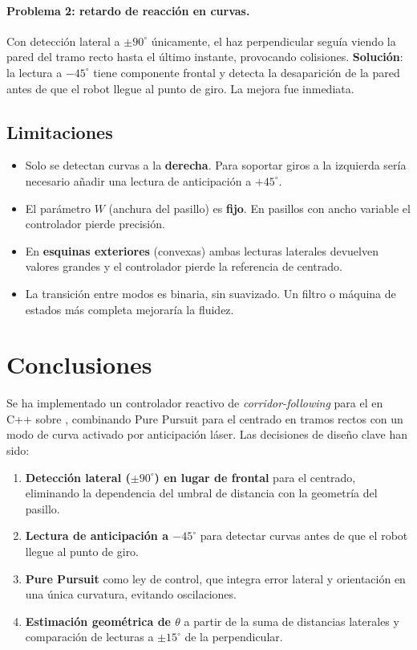 \documentclass[12pt]{article}
\begin{document}
\paragraph{Problema 2: retardo de reacci\'{o}n en curvas.}
Con detecci\'{o}n lateral a $\pm 90^\circ$ \'{u}nicamente, el haz perpendicular segu\'{i}a viendo la pared del tramo recto hasta el \'{u}ltimo instante, provocando colisiones. \textbf{Soluci\'{o}n}: la lectura a $-45^\circ$ tiene componente frontal y detecta la desaparici\'{o}n de la pared antes de que el robot llegue al punto de giro. La mejora fue inmediata.

\subsection{Limitaciones}
\begin{itemize}[leftmargin=2em]
  \item Solo se detectan curvas a la \textbf{derecha}. Para soportar giros a la izquierda ser\'{i}a necesario a\~{n}adir una lectura de anticipaci\'{o}n a $+45^\circ$.
  \item El par\'{a}metro $W$ (anchura del pasillo) es \textbf{fijo}. En pasillos con ancho variable el controlador pierde precisi\'{o}n.
  \item En \textbf{esquinas exteriores} (convexas) ambas lecturas laterales devuelven valores grandes y el controlador pierde la referencia de centrado.
  \item La transici\'{o}n entre modos es binaria, sin suavizado. Un filtro o m\'{a}quina de estados m\'{a}s completa mejorar\'{i}a la fluidez.
\end{itemize}


\section{Conclusiones}
Se ha implementado un controlador reactivo de \emph{corridor-following} para el \pioneer{} en C++ sobre \ros{}, combinando Pure Pursuit para el centrado en tramos rectos con un modo de curva activado por anticipaci\'{o}n l\'{a}ser. Las decisiones de dise\~{n}o clave han sido:

\begin{enumerate}[leftmargin=2em]
  \item \textbf{Detecci\'{o}n lateral ($\pm 90^\circ$) en lugar de frontal} para el centrado, eliminando la dependencia del umbral de distancia con la geometr\'{i}a del pasillo.
  \item \textbf{Lectura de anticipaci\'{o}n a $-45^\circ$} para detectar curvas antes de que el robot llegue al punto de giro.
  \item \textbf{Pure Pursuit} como ley de control, que integra error lateral y orientaci\'{o}n en una \'{u}nica curvatura, evitando oscilaciones.
  \item \textbf{Estimaci\'{o}n geom\'{e}trica de $\theta$} a partir de la suma de distancias laterales y comparaci\'{o}n de lecturas a $\pm 15^\circ$ de la perpendicular.
\end{enumerate}
\end{document}
